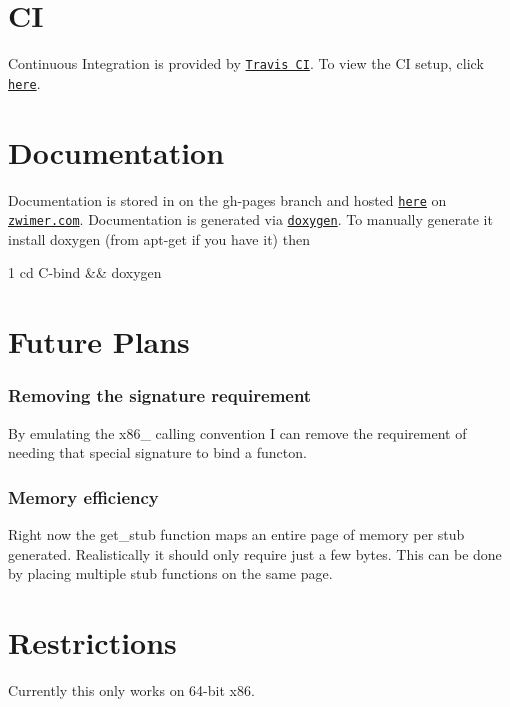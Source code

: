 \section*{CI}

Continuous Integration is provided by \href{https://travis-ci.org}{\tt Travis CI}. To view the CI setup, click \href{https://travis-ci.org/zwimer/C-bind/}{\tt here}.

\section*{Documentation}

Documentation is stored in on the {\ttfamily gh-\/pages} branch and hosted \href{https://zwimer.github.io/C-bind/docs/html/index.html}{\tt here} on \href{https://zwimer.com}{\tt zwimer.\+com}. Documentation is generated via \href{http://www.doxygen.nl/}{\tt doxygen}. To manually generate it install doxygen (from {\ttfamily apt-\/get} if you have it) then 
\begin{DoxyCode}
1 cd C-bind && doxygen
\end{DoxyCode}


\section*{Future Plans}

\subsubsection*{Removing the signature requirement}

By emulating the {\ttfamily x86\+\_} calling convention I can remove the requirement of needing that special signature to bind a functon.

\subsubsection*{Memory efficiency}

Right now the {\ttfamily get\+\_\+stub} function maps an entire page of memory per stub generated. Realistically it should only require just a few bytes. This can be done by placing multiple stub functions on the same page.

\section*{Restrictions}

Currently this only works on 64-\/bit {\ttfamily x86}. 